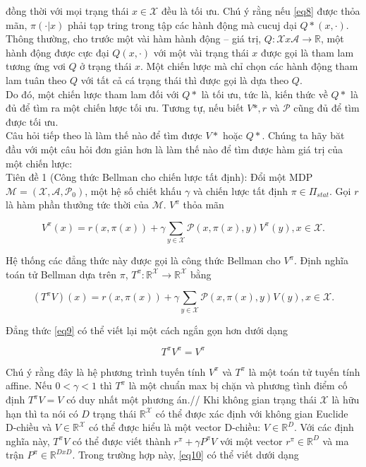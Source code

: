 \documentclass[14pt,a4paper,oneside]{report}		%
\begin{document}
đồng thời với mọi trạng thái $x \in \mathcal{X}$ đều là tối ưu. Chú ý rằng nếu \ref{eq8} được thỏa mãn, $\pi(\cdotp|x)$ phải tạp tring trong tập các hành động mà cucuj dại $Q*(x,\cdotp)$. Thông thường, cho trước một vài hàm hành động – giá trị, $Q:\mathcal{X}x\mathcal{A}\rightarrow\mathbb{R}$, một hành động được cực đại $Q(x,\cdotp)$ với một vài trạng thái $x$ được gọi là tham lam tương ứng vơi $Q$ ở trạng thái $x$. Một chiến lược mà chỉ chọn các hành động tham lam tuân theo $Q$ với tất cả cá trạng thái thì được gọi là dựa theo $Q$. \\
Do đó, một chiến lược tham lam đối với $Q*$ là tối ưu, tức là, kiến thức về $Q*$ là đủ để tìm ra một chiến lược tối ưu. Tương tự, nếu biết $V* ,r$ và $\mathcal{P}$ cũng đủ để tìm được tối ưu. \\
Câu hỏi tiếp theo là làm thế nào để tìm được $V*$ hoặc $Q*$. Chúng ta hãy băt đầu với một câu hỏi đơn giản hơn là làm thế nào để tìm được hàm giá trị của một chiến lược: \\
Tiên đề 1 (Công thức Bellman cho chiến lược tất định): Đổi một MDP $\mathcal{M} = (\mathcal{X},\mathcal{A},\mathcal{P}_0)$, một hệ số chiết khấu $\gamma$ và chiến lược tất định $\pi \in \Pi_{stat}$. Gọi $r$ là hàm phần thưởng tức thời của $\mathcal{M}$. $V^\pi$ thỏa mãn

\begin{equation} \label{eq9}
V^\pi(x) = r(x,\pi(x)) + \gamma \displaystyle\sum_{y\in\mathcal{X}}{\mathcal{P}(x,\pi(x),y)V^\pi(y)}, x\in\mathcal{X}.
\end{equation}

Hệ thống các đẳng thức này được gọi là công thức Bellman cho $V^\pi$. Định nghĩa toán tử Bellman dựa trên $\pi$, $T^\pi : \mathbb{R}^{\mathcal{X}}\rightarrow\mathbb{R}^{\mathcal{X}}$ bằng

$$(T^\pi V)(x) = r(x,\pi(x)) + \gamma \displaystyle\sum_{y\in\mathcal{X}}{\mathcal{P}(x,\pi(x),y)V(y)}, x\in\mathcal{X}.$$

Đẳng thức \ref{eq9} có thể viết lại một cách ngắn gọn hơn dưới dạng

\begin{equation} \label{eq10}
T^\pi V^\pi =V^\pi
\end{equation}

Chú ý rằng đây là hệ phương trình tuyến tính $V^\pi$ và $T^\pi$ là một toán tử tuyến tính affine. Nếu $0<\gamma<1$ thì $T^\pi$ là một chuẩn max bị chặn và phương tình điểm cố định $T^\pi V = V$ có duy nhất một phương án.//
Khi không gian trạng thái $\mathcal{X}$ là hữu hạn thì ta nói có $D$ trạng thái $\mathbb{R}^\mathcal{X}$ có thể được xác định với không gian Euclide D-chiều và $V\in\mathbb{R}^\mathcal{X}$ có thể được hiểu là một vector D-chiều: $V\in\mathbb{R}^D$. Với các định nghĩa này, $T^\pi V$ có thể được viết thành $r^\pi+\gamma P^\pi V$ với một vector $r^\pi\in\mathbb{R}^D$ và ma trận $P^\pi\in\mathbb{R}^{DxD}$. Trong trường hợp này, \ref{eq10} có thể viết dưới dạng
\end{document}
